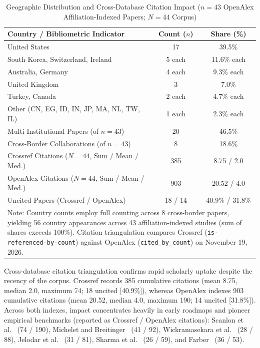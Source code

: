\begin{table}[!t]
\caption{Geographic Distribution and Cross-Database Citation Impact ($n=43$ OpenAlex Affiliation-Indexed Papers; $N=44$ Corpus)}
\label{tab:geo_distribution}
\centering
\scriptsize
\begin{tabular}{p{3.9cm}cc}
\toprule
\textbf{Country / Bibliometric Indicator} & \textbf{Count ($n$)} & \textbf{Share (\%)} \\
\midrule
United States & 17 & 39.5\% \\
South Korea, Switzerland, Ireland & 5 each & 11.6\% each \\
Australia, Germany & 4 each & 9.3\% each \\
United Kingdom & 3 & 7.0\% \\
Turkey, Canada & 2 each & 4.7\% each \\
Other (CN, EG, ID, IN, JP, MA, NL, TW, IL) & 1 each & 2.3\% each \\
\midrule
Multi-Institutional Papers (of $n=43$) & 20 & 46.5\% \\
Cross-Border Collaborations (of $n=43$) & 8 & 18.6\% \\
\midrule
Crossref Citations ($N=44$, Sum / Mean / Med.) & 385 & 8.75 / 2.0 \\
OpenAlex Citations ($N=44$, Sum / Mean / Med.) & 903 & 20.52 / 4.0 \\
Uncited Papers (Crossref / OpenAlex) & 18 / 14 & 40.9\% / 31.8\% \\
\bottomrule
\multicolumn{3}{p{7.8cm}}{\tiny Note: Country counts employ full counting across 8 cross-border papers, yielding 56 country appearances across 43 affiliation-indexed studies (sum of shares exceeds 100\%). Citation triangulation compares Crossref (\texttt{is-referenced-by-count}) against OpenAlex (\texttt{cited\_by\_count}) on November 19, 2026.}
\end{tabular}
\end{table}

Cross-database citation triangulation confirms rapid scholarly uptake despite the recency of the corpus. Crossref records 385 cumulative citations (mean 8.75, median 2.0, maximum 74; 18 uncited [40.9\%]), whereas OpenAlex indexes 903 cumulative citations (mean 20.52, median 4.0, maximum 190; 14 uncited [31.8\%]). Across both indexes, impact concentrates heavily in early roadmaps and pioneer empirical benchmarks (reported as Crossref / OpenAlex citations): Scanlon et al.~\cite{scanlon2023_chatgpt} (74 / 190), Michelet and Breitinger~\cite{michelet2024_chatgpt} (41 / 92), Wickramasekara et al.~\cite{wickramasekara2025_exploring} (28 / 88), Jelodar et al.~\cite{jelodar2026_large} (31 / 81), Sharma et al.~\cite{sharma2025_forensicllm} (26 / 59), and Farber~\cite{farber2025_scpaiscp} (36 / 53).

